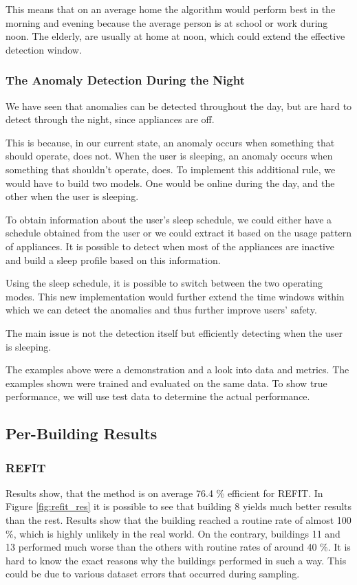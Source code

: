 This means that on an average home the algorithm would perform best in the morning and evening because the average person is at school or work during noon. 
The elderly, are usually at home at noon, which could extend the effective detection window.


\subsubsection{The Anomaly Detection During the Night}

We have seen that anomalies can be detected throughout the day,
but are hard to detect through the night, since appliances are off.

This is because, in our current state, an anomaly occurs when something that should operate, does not.
When the user is sleeping, an anomaly occurs when something that shouldn't operate, does. 
To implement this additional rule, we would have to build two models.
One would be online during the day, and the other when the user is sleeping.

To obtain information about the user's sleep schedule, we could either have a schedule obtained from the user or we could extract it based on the usage pattern of appliances.
It is possible to detect when most of the appliances are inactive and build a sleep profile based on this information.

Using the sleep schedule, it is possible to switch between the two operating modes. 
This new implementation would further extend the time windows within which we can detect the anomalies and thus further improve users' safety.

The main issue is not the detection itself but efficiently detecting
when the user is sleeping. 

The examples above were a demonstration and a look into data and metrics. 
The examples shown were trained and evaluated on the same data. 
To show true performance, we will use test data to determine the actual performance. 


\subsection{Per-Building Results}
\subsubsection{REFIT}

Results show, that the method is on average 76.4 \% efficient for REFIT.  
In Figure \ref{fig:refit_res} it is possible to see that building 8 yields much better results than the rest.
Results show that the building reached a routine rate of almost 100 \%, which is highly unlikely in the real world. 
On the contrary, buildings 11 and 13 performed much worse than the others with routine rates of around 40 \%.
It is hard to know the exact reasons why the buildings performed in such a way.
This could be due to various dataset errors that occurred during sampling.


